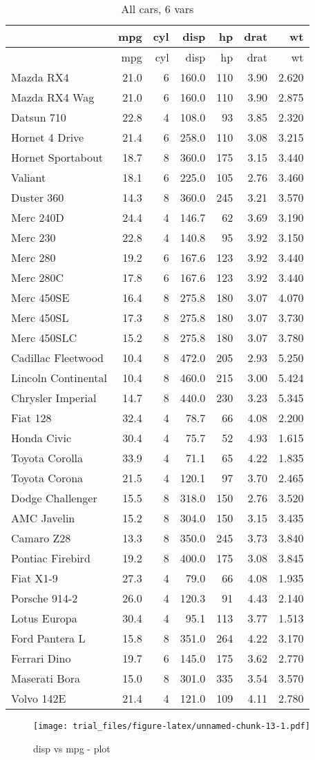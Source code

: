 \documentclass[]{article}
\begin{document}
\begin{longtable}[]{@{}lrrrrrr@{}}
\caption{All cars, 6 vars}\tabularnewline
\toprule
& mpg & cyl & disp & hp & drat & wt\tabularnewline
\midrule
\endfirsthead
\toprule
& mpg & cyl & disp & hp & drat & wt\tabularnewline
\midrule
\endhead
Mazda RX4 & 21.0 & 6 & 160.0 & 110 & 3.90 & 2.620\tabularnewline
Mazda RX4 Wag & 21.0 & 6 & 160.0 & 110 & 3.90 & 2.875\tabularnewline
Datsun 710 & 22.8 & 4 & 108.0 & 93 & 3.85 & 2.320\tabularnewline
Hornet 4 Drive & 21.4 & 6 & 258.0 & 110 & 3.08 & 3.215\tabularnewline
Hornet Sportabout & 18.7 & 8 & 360.0 & 175 & 3.15 & 3.440\tabularnewline
Valiant & 18.1 & 6 & 225.0 & 105 & 2.76 & 3.460\tabularnewline
Duster 360 & 14.3 & 8 & 360.0 & 245 & 3.21 & 3.570\tabularnewline
Merc 240D & 24.4 & 4 & 146.7 & 62 & 3.69 & 3.190\tabularnewline
Merc 230 & 22.8 & 4 & 140.8 & 95 & 3.92 & 3.150\tabularnewline
Merc 280 & 19.2 & 6 & 167.6 & 123 & 3.92 & 3.440\tabularnewline
Merc 280C & 17.8 & 6 & 167.6 & 123 & 3.92 & 3.440\tabularnewline
Merc 450SE & 16.4 & 8 & 275.8 & 180 & 3.07 & 4.070\tabularnewline
Merc 450SL & 17.3 & 8 & 275.8 & 180 & 3.07 & 3.730\tabularnewline
Merc 450SLC & 15.2 & 8 & 275.8 & 180 & 3.07 & 3.780\tabularnewline
Cadillac Fleetwood & 10.4 & 8 & 472.0 & 205 & 2.93 &
5.250\tabularnewline
Lincoln Continental & 10.4 & 8 & 460.0 & 215 & 3.00 &
5.424\tabularnewline
Chrysler Imperial & 14.7 & 8 & 440.0 & 230 & 3.23 & 5.345\tabularnewline
Fiat 128 & 32.4 & 4 & 78.7 & 66 & 4.08 & 2.200\tabularnewline
Honda Civic & 30.4 & 4 & 75.7 & 52 & 4.93 & 1.615\tabularnewline
Toyota Corolla & 33.9 & 4 & 71.1 & 65 & 4.22 & 1.835\tabularnewline
Toyota Corona & 21.5 & 4 & 120.1 & 97 & 3.70 & 2.465\tabularnewline
Dodge Challenger & 15.5 & 8 & 318.0 & 150 & 2.76 & 3.520\tabularnewline
AMC Javelin & 15.2 & 8 & 304.0 & 150 & 3.15 & 3.435\tabularnewline
Camaro Z28 & 13.3 & 8 & 350.0 & 245 & 3.73 & 3.840\tabularnewline
Pontiac Firebird & 19.2 & 8 & 400.0 & 175 & 3.08 & 3.845\tabularnewline
Fiat X1-9 & 27.3 & 4 & 79.0 & 66 & 4.08 & 1.935\tabularnewline
Porsche 914-2 & 26.0 & 4 & 120.3 & 91 & 4.43 & 2.140\tabularnewline
Lotus Europa & 30.4 & 4 & 95.1 & 113 & 3.77 & 1.513\tabularnewline
Ford Pantera L & 15.8 & 8 & 351.0 & 264 & 4.22 & 3.170\tabularnewline
Ferrari Dino & 19.7 & 6 & 145.0 & 175 & 3.62 & 2.770\tabularnewline
Maserati Bora & 15.0 & 8 & 301.0 & 335 & 3.54 & 3.570\tabularnewline
Volvo 142E & 21.4 & 4 & 121.0 & 109 & 4.11 & 2.780\tabularnewline
\bottomrule
\end{longtable}

\begin{figure}[htbp]
\centering
\texttt{[image: trial\_files/figure-latex/unnamed-chunk-13-1.pdf]}
\caption{disp vs mpg - plot}
\end{figure}
\end{document}
